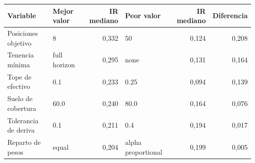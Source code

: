 \begin{tabular}{llrlrr}
\toprule
Variable & Mejor valor & IR mediano & Peor valor & IR mediano & Diferencia \\
\midrule
Posiciones objetivo & 8 & 0,332 & 50 & 0,124 & 0,208 \\
Tenencia mínima & full horizon & 0,295 & none & 0,131 & 0,164 \\
Tope de efectivo & 0.1 & 0,233 & 0.25 & 0,094 & 0,139 \\
Suelo de cobertura & 60.0 & 0,240 & 80.0 & 0,164 & 0,076 \\
Tolerancia de deriva & 0.1 & 0,211 & 0.4 & 0,194 & 0,017 \\
Reparto de pesos & equal & 0,204 & alpha proportional & 0,199 & 0,005 \\
\bottomrule
\end{tabular}
